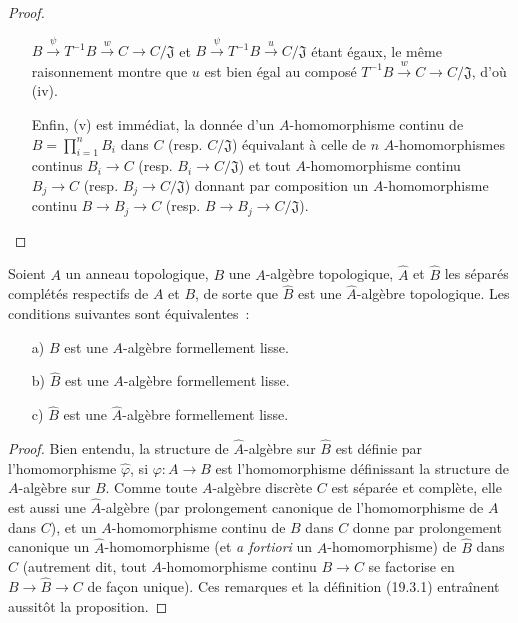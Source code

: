 \begin{proof}
\begin{enumerate}
  $B\xrightarrow{\psi}T^{-1}B\xrightarrow{w}C\to C/\mathfrak J$ et
  $B\xrightarrow{\psi}T^{-1}B\xrightarrow{u}C/\mathfrak J$ étant égaux, le même
  raisonnement montre que $u$ est bien égal au composé
  $T^{-1}B\xrightarrow{w}C\to C/\mathfrak J$, d'où (iv).
  \item[] Enfin, (v) est immédiat, la donnée d'un $A$-homomorphisme
  continu de $B=\prod_{i=1}^n B_i$ dans $C$ (resp. $C/\mathfrak J$)
  équivalant à celle de $n$ $A$-homomorphismes continus $B_i\to C$
  (resp. $B_i\to C/\mathfrak J$) et tout $A$-homomorphisme continu
  $B_j\to C$ (resp. $B_j\to C/\mathfrak J$) donnant par composition un
  $A$-homomorphisme continu $B\to B_j\to C$
  (resp. $B\to B_j\to C/\mathfrak J$).
\end{enumerate}
\end{proof}

\begin{proposition}[19.3.6]
\label{0.19.3.6-fr}
Soient $A$ un anneau topologique, $B$ une $A$-algèbre topologique, $\hat A$
et $\hat B$ les séparés complétés respectifs de $A$ et $B$, de sorte que
$\hat B$ est une $\hat A$-algèbre topologique. Les conditions suivantes
sont équivalentes~:
\begin{enumerate}
  \item[\textup{a)}] $B$ est une $A$-algèbre formellement lisse.
  \item[\textup{b)}] $\hat B$ est une $A$-algèbre formellement lisse.
  \item[\textup{c)}] $\hat B$ est une $\hat A$-algèbre formellement lisse.
\end{enumerate}
\end{proposition}

\begin{proof}
Bien entendu, la structure de $\hat A$-algèbre sur $\hat B$ est définie
par l'homomorphisme $\hat\varphi$, si $\varphi:A\to B$ est
l'homomorphisme définissant la structure de $A$-algèbre sur $B$. Comme toute
$A$-algèbre discrète $C$ est séparée et complète, elle est aussi une
$\hat A$-algèbre (par prolongement canonique de l'homomorphisme de $A$ dans
$C$), et un $A$-homomorphisme continu de $B$ dans $C$ donne par prolongement
canonique un $\hat A$-homomorphisme (et \emph{a fortiori} un
$A$-homomorphisme) de $\hat B$ dans $C$ (autrement dit, tout
$A$-homomorphisme continu $B\to C$ se factorise en $B\to\hat B\to C$ de façon
unique). Ces remarques et la définition (19.3.1) entraînent aussitôt la
proposition.
\end{proof}

